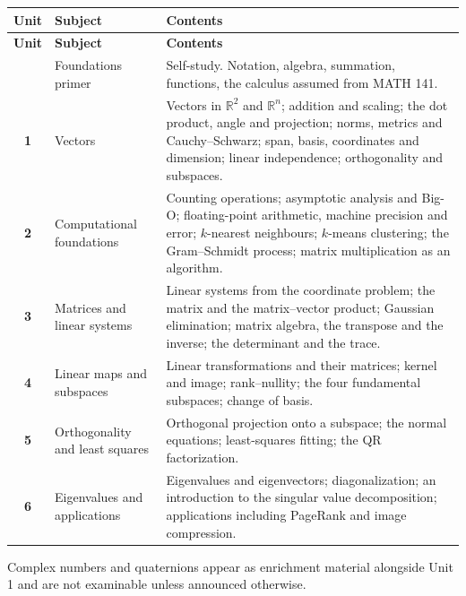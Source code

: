 \documentclass[11pt]{article}
\begin{document}
\renewcommand{\arraystretch}{1.3}
\begin{center}
\begin{longtable}{@{} >{\bfseries}c >{\raggedright\arraybackslash}p{4.5cm} >{\raggedright\arraybackslash}p{9.2cm} @{}}
\toprule
\textbf{Unit} & \textbf{Subject} & \textbf{Contents} \\
\midrule
\endfirsthead
\toprule
\textbf{Unit} & \textbf{Subject} & \textbf{Contents} \\
\midrule
\endhead
\bottomrule
\endlastfoot
0 & Foundations primer & Self-study. Notation, algebra, summation, functions,
    the calculus assumed from MATH 141. \\
1 & Vectors & Vectors in $\mathbb{R}^{2}$ and $\mathbb{R}^{n}$; addition and
    scaling; the dot product, angle and projection; norms, metrics and
    Cauchy--Schwarz; span, basis, coordinates and dimension; linear
    independence; orthogonality and subspaces. \\
2 & Computational foundations & Counting operations; asymptotic analysis and
    Big-O; floating-point arithmetic, machine precision and error;
    $k$-nearest neighbours; $k$-means clustering; the Gram--Schmidt process;
    matrix multiplication as an algorithm. \\
3 & Matrices and linear systems & Linear systems from the coordinate problem;
    the matrix and the matrix--vector product; Gaussian elimination; matrix
    algebra, the transpose and the inverse; the determinant and the trace. \\
4 & Linear maps and subspaces & Linear transformations and their matrices;
    kernel and image; rank--nullity; the four fundamental subspaces;
    change of basis. \\
5 & Orthogonality and least squares & Orthogonal projection onto a subspace;
    the normal equations; least-squares fitting; the QR factorization. \\
6 & Eigenvalues and applications & Eigenvalues and eigenvectors;
    diagonalization; an introduction to the singular value decomposition;
    applications including PageRank and image compression. \\
\end{longtable}
\end{center}

Complex numbers and quaternions appear as enrichment material alongside Unit 1
and are not examinable unless announced otherwise.

\end{document}
